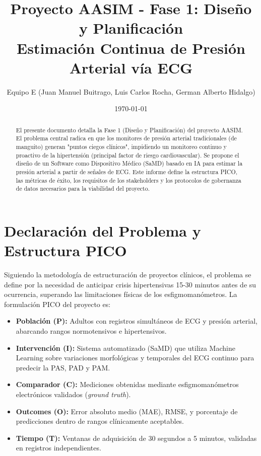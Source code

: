 \documentclass[11pt, a4paper]{article}
\title{Proyecto AASIM - Fase 1: Diseño y Planificación \\ \large Estimación Continua de Presión Arterial vía ECG}
\author{Equipo E (Juan Manuel Buitrago, Luis Carlos Rocha, German Alberto Hidalgo)}
\date{\today}
\begin{document}
\maketitle

\begin{abstract}
El presente documento detalla la Fase 1 (Diseño y Planificación) del proyecto AASIM. El problema central radica en que los monitores de presión arterial tradicionales (de manguito) generan "puntos ciegos clínicos", impidiendo un monitoreo continuo y proactivo de la hipertensión (principal factor de riesgo cardiovascular). Se propone el diseño de un Software como Dispositivo Médico (SaMD) basado en IA para estimar la presión arterial a partir de señales de ECG. Este informe define la estructura PICO, las métricas de éxito, los requisitos de los stakeholders y los protocolos de gobernanza de datos necesarios para la viabilidad del proyecto.
\end{abstract}

\section{Declaración del Problema y Estructura PICO}
Siguiendo la metodología de estructuración de proyectos clínicos, el problema se define por la necesidad de anticipar crisis hipertensivas 15-30 minutos antes de su ocurrencia, superando las limitaciones físicas de los esfigmomanómetros. La formulación PICO del proyecto es:

\begin{itemize}
    \item \textbf{Población (P):} Adultos con registros simultáneos de ECG y presión arterial, abarcando rangos normotensivos e hipertensivos.
    \item \textbf{Intervención (I):} Sistema automatizado (SaMD) que utiliza Machine Learning sobre variaciones morfológicas y temporales del ECG continuo para predecir la PAS, PAD y PAM.
    \item \textbf{Comparador (C):} Mediciones obtenidas mediante esfigmomanómetros electrónicos validados (\textit{ground truth}).
    \item \textbf{Outcomes (O):} Error absoluto medio (MAE), RMSE, y porcentaje de predicciones dentro de rangos clínicamente aceptables.
    \item \textbf{Tiempo (T):} Ventanas de adquisición de 30 segundos a 5 minutos, validadas en registros independientes.
\end{itemize}
\end{document}
